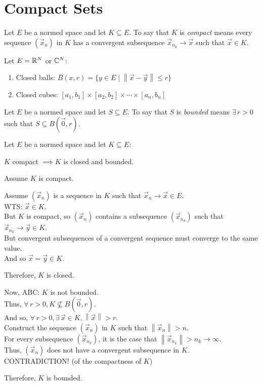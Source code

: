\documentclass[letterpaper,12pt,fleqn]{article}
\newcommand{\vx}{\vec{x}}
\newcommand{\vy}{\vec{y}}
\newcommand{\vo}{\vec{0}}
\newcommand{\norm}[1]{\left\|#1\right\|}
\newcommand{\cl}[1]{\overline{#1}}
\begin{document}
\section*{Compact Sets}

\begin{definition}[Compact]
  Let $E$ be a normed space and let $K\subseteq E$. To say that $K$ is
  \emph{compact} means every sequence $(\vx_n)$ in $K$ has a convergent
  subsequence $\vx_{n_k}\to\vx$ such that $\vx\in K$.
\end{definition}

\begin{examples}
  Let $E=\mathbb{R}^N$ or $\mathbb{C}^N$:
  \begin{enumerate}
  \item Closed balls: $\cl{B}(x,r)=\{y\in E\mid\norm{\vx-\vy}\le r\}$
  \item Closed cubes: $[a_1,b_1]\times[a_2,b_2]\times\cdots\times[a_n,b_n]$
  \end{enumerate}
\end{examples}

\begin{definition}[Bounded]
  Let $E$ be a normed space and let $S\subseteq E$. To say that $S$ is
  \emph{bounded} means $\exists\,r>0$ such that $S\subseteq B(\vo,r)$.
\end{definition}

\begin{theorem}
  Let $E$ be a normed space and let $K\subseteq E$:

  \qquad$K$ compact $\implies K$ is closed and bounded.
\end{theorem}

\begin{theproof}
  Assume $K$ is compact.
  
  Assume $(\vx_n)$ is a sequence in $K$ such that $\vx_n\to\vx\in E$. \\
  WTS: $\vx\in K$. \\
  But $K$ is compact, so $(\vx_n)$ contains a subsequence $(\vx_{n_k})$ such
  that $\vx_{n_k}\to\vy\in K$. \\
  But convergent subsequences of a convergent sequence must converge to the
  same value. \\
  And so $\vx=\vy\in K$.

  Therefore, $K$ is closed.

  Now, ABC: $K$ is not bounded. \\
  Thus, $\forall\,r>0,K\not\subseteq B(\vo,r)$. \\
  And so, $\forall\,r>0,\exists\,\vx\in K,\norm{\vx}>r$. \\
  Construct the sequence $(\vx_n)$ in $K$ such that $\norm{\vx_n}>n$. \\
  For every subsequence $(\vx_{n_k})$, it is the case that
  $\norm{\vx_{n_k}}>n_k\to\infty$. \\
  Thus, $(\vx_n)$ does not have a convergent subsequence in $K$. \\
  CONTRADICTION! (of the compactness of $K$)

  Therefore, $K$ is bounded.
\end{theproof}
\end{document}
